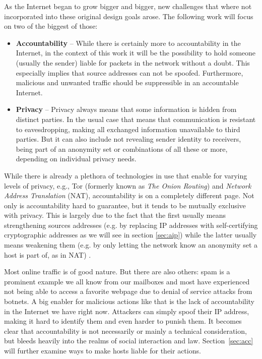 \documentclass{acm_proc_article-sp}
\begin{document}
As the Internet began to grow bigger and bigger, new challenges that where not incorporated into these original design goals arose. The following work will focus on two of the biggest of those:
\begin{itemize}
	\item \textbf{Accountability} -- While there is certainly more to accountability in the Internet, in the context of this work it will be the possibility to hold someone (usually the sender) liable for packets in the network without a doubt. This especially implies that source addresses can not be spoofed. Furthermore, malicious and unwanted traffic should be suppressible in an accountable Internet.
	\item \textbf{Privacy} -- Privacy always means that some information is hidden from distinct parties. In the usual case that means that communication is resistant to eavesdropping, making all exchanged information unavailable to third parties. But it can also include not revealing sender identity to receivers, being part of an anonymity set or combinations of all these or more, depending on individual privacy needs.
\end{itemize}

While there is already a plethora of technologies in use that enable for varying levels of privacy, e.g., Tor (formerly known as \emph{The Onion Routing}) and \emph{Network Address Translation} (NAT), accountability is on a completely different page. Not only is accountability hard to guarantee, but it tends to be mutually exclusive with privacy. This is largely due to the fact that the first usually means strengthening sources addresses (e.g. by replacing IP addresses with self-certifying cryptographic addresses as we will see in section \ref{sec:aip}) while the latter usually means weakening them (e.g. by only letting the network know an anonymity set a host is part of, as in NAT) \cite{apip}.

Most online traffic is of good nature. But there are also others: spam is a prominent example we all know from our mailboxes and most have experienced not being able to access a favorite webpage due to denial of service attacks from botnets. A big enabler for malicious actions like that is the lack of accountability in the Internet we have right now. Attackers can simply spoof their IP address, making it hard to identify them and even harder to punish them. It becomes clear that accountability is not necessarily or mainly a technical consideration, but bleeds heavily into the realms of social interaction and law. Section~\ref{sec:acc} will further examine ways to make hosts liable for their actions.
\end{document}

